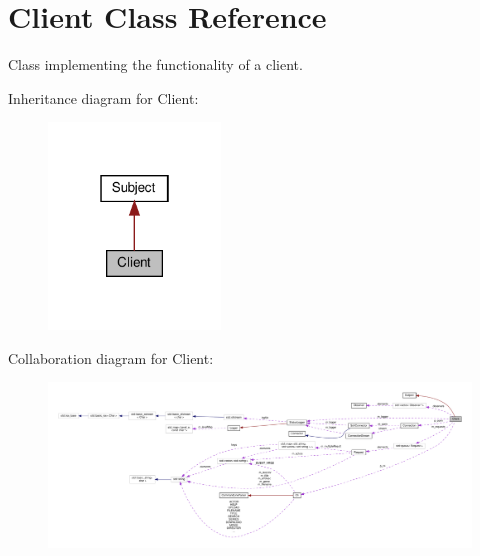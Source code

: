 \hypertarget{classClient}{}\section{Client Class Reference}
\label{classClient}


Class implementing the functionality of a client.  




Inheritance diagram for Client\+:\nopagebreak
\begin{figure}[H]
\begin{center}
\leavevmode
\includegraphics[width=130pt]{classClient__inherit__graph}
\end{center}
\end{figure}


Collaboration diagram for Client\+:\nopagebreak
\begin{figure}[H]
\begin{center}
\leavevmode
\includegraphics[width=350pt]{classClient__coll__graph}
\end{center}
\end{figure}
